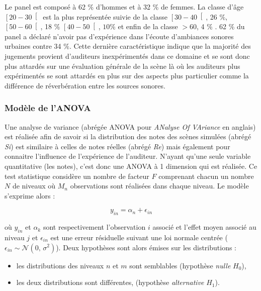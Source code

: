 Le panel est composé à 62 $\%$ d'hommes et à 32 $\%$ de femmes. La classe d'âge $\left[20-30\right[$ est la plus représentée suivie de la classe $\left[30-40\right[$, 26 $\%$, $\left[50-60\right[$,  18 $\%$ $\left[40-50\right[$, $10\%$ et enfin de la classe $>60$,  4 $\%$ . 62 $\%$ du panel a déclaré n'avoir pas d'expérience dans l'écoute d'ambiances sonores urbaines contre 34 $\%$. Cette dernière caractéristique indique que la majorité des jugements provient d'auditeurs inexpérimentés dans ce domaine et se sont donc plus attardés sur une évaluation générale de la scène là où les auditeurs plus expérimentés se sont attardés en plus sur des aspects plus particulier comme la différence de réverbération entre les sources sonores. \\

\subsubsection{Modèle de l'ANOVA}
Une analyse de variance (abrégée ANOVA pour \textit{ANalyse Of VAriance} en anglais) est réalisée afin de savoir si la distribution des notes des scènes simulées (abrégé \textit{Si}) est similaire à celles de notes réelles (abrégé \textit{Re}) mais également pour connaitre l'influence de l'expérience de l'auditeur. N'ayant qu'une seule variable quantitative (les notes), c'est donc une ANOVA à 1 dimension qui est réalisée. Ce test statistique considère un nombre de facteur $F$ comprenant chacun un nombre $N$ de niveaux où $M_n$ observations sont réalisées dans chaque niveau. Le modèle s'exprime alors : 

\begin{equation}
y_{in} = \alpha_n + \epsilon_{in}
\end{equation}

où $y_{in}$  et $\alpha_k$ sont respectivement l'observation $i$ associé et l'effet moyen associé au niveau $j$ et $\epsilon_{in}$ est une erreur résiduelle suivant une loi normale centrée ($\epsilon_{in} \sim \mathcal{N}(0,\,\sigma^{2})$). Deux hypothèses sont alors émises sur les distributions : 

\begin{itemize}
\item les distributions des niveaux $n$ et $m$ sont semblables (hypothèse \textit{nulle} $H_0$),
\item les deux distributions sont différentes, (hypothèse \textit{alternative} $H_1$).\\
\end{itemize}

